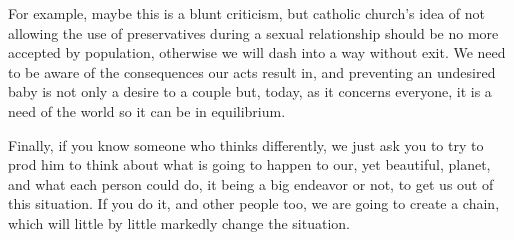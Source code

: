 \documentclass[a4paper,12pt]{article}
\begin{document}
For example, maybe this is a {\color{red}blunt} criticism, but catholic church's idea of not allowing
the use of preservatives during a sexual relationship should be no more accepted
by  population,   otherwise  we  will  {\color{red}dash}  into   a  way  without
exit. We need to be aware of the consequences our acts result in, and preventing
an undesired baby  is not only a desire to a couple but, today,  as it concerns
everyone, it is a need of the world so it can be in equilibrium.

Finally, if you know someone who thinks differently, we just ask you to try to {\color{red}prod} him
to think about what  is going to happen to our, yet  beautiful, planet, and what
each person could do, it being a big {\color{red}endeavor} or not, to get us out of this situation.
If you do it, and other people too, we are going to create a chain, which will
little by  little {\color{red}markedly} change the situation.  
\end{document}
